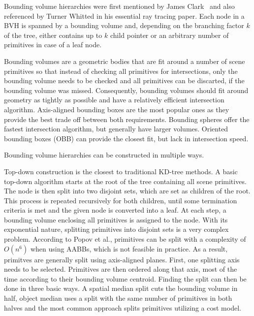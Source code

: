 Bounding volume hierarchies were first mentioned by James Clark~\cite{clark1976bvh} and also referenced by Turner Whitted\cite{whitted_improved_1980} in his essential ray tracing paper. Each node in a BVH is spanned by a bounding volume and, depending on the branching factor $k$ of the tree, either contains up to $k$ child pointer or an arbitrary number of primitives in case of a leaf node.


Bounding volumes are a geometric bodies that are fit around a number of scene primitives so that instead of checking all primitives for intersections, only the bounding volume needs to be checked and all primitives can be discarted, if the bounding volume was missed. Consequently, bounding volumes should fit around geometry as tightly as possible and have a relatively efficient intersection algorithm. Axis-aligned bounding boxes are the most popular ones as they provide the best trade off between both requirements. Bounding spheres offer the fastest intersection algorithm, but generally have larger volumes. Oriented bounding boxes (OBB) can provide the closest fit, but lack in intersection speed.

Bounding volume hierarchies can be constructed in multiple ways.

Top-down construction is the closest to traditional KD-tree methods\cite{wald07fastConstruction}. A basic top-down algorithm starts at the root of the tree containing all scene primitives. The node is then split into two disjoint sets, which are set as children of the root. This process is repeated recursively for both children, until some termination criteria is met and the given node is converted into a leaf. At each step, a bounding volume enclosing all primitives is assigned to the node. With its exponential nature, splitting primitives into disjoint sets is a very complex problem. According to Popov et al.\cite{popov09harmful}, primitives can be split with a complexity of $O(n^6)$ when using AABBs, which is not feasible in practice. As a result, primitves are generally split using axis-aligned planes. First, one splitting axis needs to be selected. Primitives are then ordered along that axis, most of the time according to their bounding volume centroid. Finding the split can then be done in three basic ways. A spatial median split cuts the bounding volume in half, object median uses a split with the same number of primitives in both halves and the most common approach splits primitives utilizing a cost model. 

